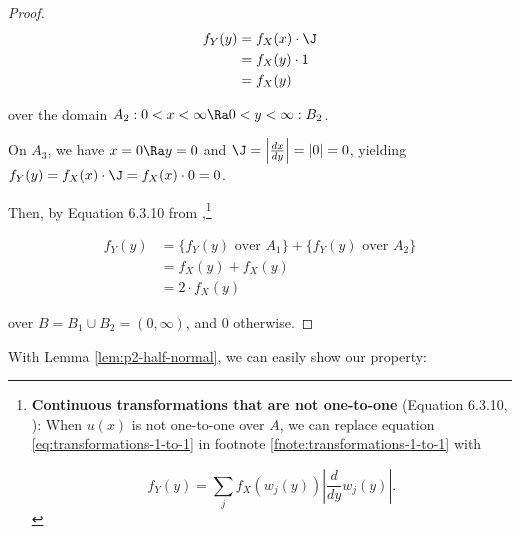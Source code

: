 \begin{proof}
  \begin{align*}
    f_Y(y) &= f_X(x) \cdot \J \\
    &= f_X(y) \cdot 1 \\
    &= f_X(y)
  \end{align*}

  over the domain $A_2: 0 < x < \infty \Ra 0 < y < \infty :B_2$.

  On $A_3$, we have $x = 0 \Ra y = 0$ and $\J = \left| \frac{dx}{dy} \right| =
  |0| = 0$, yielding $f_Y(y) = f_X(x) \cdot \J = f_X(x) \cdot 0 = 0$.

  Then, by Equation 6.3.10 from \citet{textbook},\footnote{\textbf{Continuous
  transformations that are not one-to-one} (Equation 6.3.10,
  \citealp{textbook}): When $u(x)$ is not one-to-one over $A$, we can replace
  equation \eqref{eq:transformations-1-to-1} in footnote
  \ref{fnote:transformations-1-to-1} with 

  \begin{equation*}
    f_Y(y) = \sum_j f_X(w_j(y)) \left| \frac{d}{dy} w_j(y) \right|.
  \end{equation*}
  }

  \begin{align*}
    f_Y(y) &= \{ f_Y(y) \textrm{ over } A_1 \} + \{ f_Y(y) \textrm{ over } A_2 \} \\
    &= f_X(y) + f_X(y) \\
    &= 2 \cdot f_X(y)
  \end{align*}

  over $B = B_1 \cup B_2 = (0, \infty)$, and 0 otherwise.
\end{proof}

With Lemma \ref{lem:p2-half-normal}, we can easily show our property:

